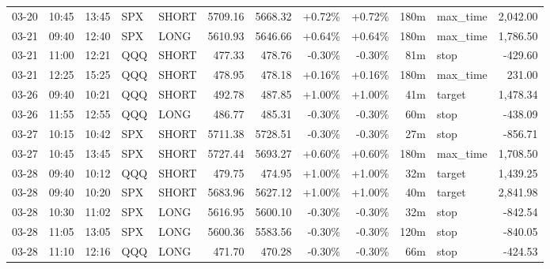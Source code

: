 \documentclass[11pt,a4paper,twoside]{article}
\begin{document}
\begin{center}
\begin{longtable}{>{\color{txtmain}}l l l l l r r r r r >{\color{txtmain}}l r}
03-20 & 10:45 & 13:45 & SPX & SHORT & 5709.16 & 5668.32 & \textcolor{wingreen}{+0.72\%} & \textcolor{wingreen}{+0.72\%} & 180m & max\_time & \textcolor{wingreen}{2,042.00} \\
03-21 & 09:40 & 12:40 & SPX & LONG & 5610.93 & 5646.66 & \textcolor{wingreen}{+0.64\%} & \textcolor{wingreen}{+0.64\%} & 180m & max\_time & \textcolor{wingreen}{1,786.50} \\
03-21 & 11:00 & 12:21 & QQQ & SHORT & 477.33 & 478.76 & \textcolor{lossred}{-0.30\%} & \textcolor{lossred}{-0.30\%} & 81m & stop & \textcolor{lossred}{-429.60} \\
03-21 & 12:25 & 15:25 & QQQ & SHORT & 478.95 & 478.18 & \textcolor{wingreen}{+0.16\%} & \textcolor{wingreen}{+0.16\%} & 180m & max\_time & \textcolor{wingreen}{231.00} \\
03-26 & 09:40 & 10:21 & QQQ & SHORT & 492.78 & 487.85 & \textcolor{wingreen}{+1.00\%} & \textcolor{wingreen}{+1.00\%} & 41m & target & \textcolor{wingreen}{1,478.34} \\
03-26 & 11:55 & 12:55 & QQQ & LONG & 486.77 & 485.31 & \textcolor{lossred}{-0.30\%} & \textcolor{lossred}{-0.30\%} & 60m & stop & \textcolor{lossred}{-438.09} \\
03-27 & 10:15 & 10:42 & SPX & SHORT & 5711.38 & 5728.51 & \textcolor{lossred}{-0.30\%} & \textcolor{lossred}{-0.30\%} & 27m & stop & \textcolor{lossred}{-856.71} \\
03-27 & 10:45 & 13:45 & SPX & SHORT & 5727.44 & 5693.27 & \textcolor{wingreen}{+0.60\%} & \textcolor{wingreen}{+0.60\%} & 180m & max\_time & \textcolor{wingreen}{1,708.50} \\
03-28 & 09:40 & 10:12 & QQQ & SHORT & 479.75 & 474.95 & \textcolor{wingreen}{+1.00\%} & \textcolor{wingreen}{+1.00\%} & 32m & target & \textcolor{wingreen}{1,439.25} \\
03-28 & 09:40 & 10:20 & SPX & SHORT & 5683.96 & 5627.12 & \textcolor{wingreen}{+1.00\%} & \textcolor{wingreen}{+1.00\%} & 40m & target & \textcolor{wingreen}{2,841.98} \\
03-28 & 10:30 & 11:02 & SPX & LONG & 5616.95 & 5600.10 & \textcolor{lossred}{-0.30\%} & \textcolor{lossred}{-0.30\%} & 32m & stop & \textcolor{lossred}{-842.54} \\
03-28 & 11:05 & 13:05 & SPX & LONG & 5600.36 & 5583.56 & \textcolor{lossred}{-0.30\%} & \textcolor{lossred}{-0.30\%} & 120m & stop & \textcolor{lossred}{-840.05} \\
03-28 & 11:10 & 12:16 & QQQ & LONG & 471.70 & 470.28 & \textcolor{lossred}{-0.30\%} & \textcolor{lossred}{-0.30\%} & 66m & stop & \textcolor{lossred}{-424.53} \\

\end{longtable}
\end{center}
\end{document}
